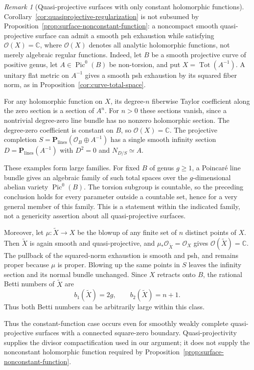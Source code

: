 \documentclass[11pt]{amsart}
\theoremstyle{definition}
\theoremstyle{remark}
\newtheorem{remark}[theorem]{Remark}
\numberwithin{equation}{section}
\newcommand{\C}{\mathbb C}
\newcommand{\PP}{\mathbf P}
\newcommand{\OO}{\mathcal O}
\newcommand{\Tot}{\operatorname{Tot}}
\begin{document}
\begin{remark}[Quasi-projective surfaces with only constant holomorphic functions]
\label{rem:quasiprojective-constant-functions}
Corollary~\ref{cor:quasiprojective-regularization} is not subsumed by
Proposition~\ref{prop:surface-nonconstant-function}: a noncompact
smooth quasi-projective surface can admit a smooth psh exhaustion
while satisfying $\OO(X)=\C$, where $\OO(X)$ denotes all analytic
holomorphic functions, not merely algebraic regular functions.
Indeed, let $B$ be a smooth projective curve of positive genus,
let $A\in\operatorname{Pic}^0(B)$ be non-torsion, and put
$X=\Tot(A^{-1})$.  A unitary flat metric on $A^{-1}$ gives a smooth
psh exhaustion by its squared fiber norm, as in
Proposition~\ref{cor:curve-total-space}.

For any holomorphic function on $X$, its degree-$n$ fiberwise Taylor
coefficient along the zero section is a section of $A^n$.
For $n>0$ these sections vanish, since a nontrivial degree-zero line
bundle has no nonzero holomorphic section.  The degree-zero
coefficient is constant on $B$, so $\OO(X)=\C$.
The projective completion
$S=\PP_{\mathrm{lines}}(\OO_B\oplus A^{-1})$ has a single smooth
infinity section $D=\PP_{\mathrm{lines}}(A^{-1})$ with
$D^2=0$ and $N_{D/S}\simeq A$.

These examples form large families.  For fixed $B$ of genus $g\ge1$,
a Poincar\'e line bundle gives an algebraic family of such total
spaces over the $g$-dimensional abelian variety
$\operatorname{Pic}^0(B)$.  The torsion subgroup is countable, so
the preceding conclusion holds for every parameter outside a
countable set, hence for a very general member of this family.
This is a statement within the indicated family, not a genericity
assertion about all quasi-projective surfaces.

Moreover, let $\mu:\widetilde X\to X$ be the blowup of any finite
set of $n$ distinct points of $X$.  Then $\widetilde X$ is again
smooth and quasi-projective, and
$\mu_*\OO_{\widetilde X}=\OO_X$ gives
$\OO(\widetilde X)=\C$.  The pullback of the squared-norm exhaustion
is smooth and psh, and remains proper because $\mu$ is proper.
Blowing up the same points in $S$ leaves the infinity section and its
normal bundle unchanged.  Since $X$ retracts onto $B$, the rational
Betti numbers of $\widetilde X$ are
\[
 b_1(\widetilde X)=2g,\qquad b_2(\widetilde X)=n+1.
\]
Thus both Betti numbers can be arbitrarily large within this class.

Thus the constant-function case occurs even for smoothly weakly
complete quasi-projective surfaces with a connected square-zero
boundary.  Quasi-projectivity supplies the divisor compactification
used in our argument; it does not supply the nonconstant holomorphic
function required by
Proposition~\ref{prop:surface-nonconstant-function}.
\end{remark}
\end{document}
